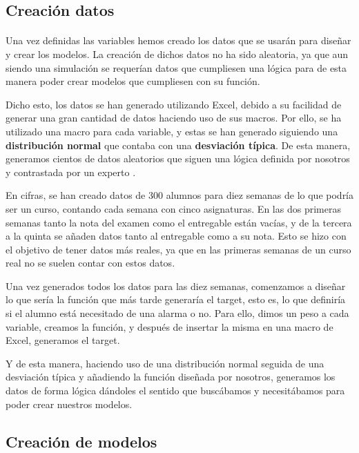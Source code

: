 \subsection{Creación datos}
\paragraph{}
Una vez definidas las variables hemos creado los datos que se usarán para diseñar y crear los modelos. La creación de dichos datos no ha sido aleatoria, ya que aun siendo una simulación se requerían datos que cumpliesen una lógica para de esta manera poder crear modelos que cumpliesen con su función.

Dicho esto, los datos se han generado utilizando Excel, debido a su facilidad de generar una gran cantidad de datos haciendo uso de sus macros. Por ello, se ha utilizado una macro para cada variable, y estas se han generado siguiendo una \textbf{distribución normal} que contaba con una \textbf{desviación típica}. De esta manera, generamos cientos de datos aleatorios que siguen una lógica definida por nosotros y contrastada por un experto .

En cifras, se han creado datos de 300 alumnos para diez semanas de lo que podría ser un curso, contando cada semana con cinco asignaturas. En las dos primeras semanas tanto la nota del examen como el entregable están vacías, y de la tercera a la quinta se añaden datos tanto al entregable como a su nota. Esto se hizo con el objetivo de tener datos más reales, ya que en las primeras semanas de un curso real no se suelen contar con estos datos.

Una vez generados todos los datos para las diez semanas, comenzamos a diseñar lo que sería la función que más tarde generaría el target, esto es, lo que definiría si el alumno está necesitado de una alarma o no. Para ello, dimos un peso a cada variable, creamos la función, y después de insertar la misma en una macro de Excel, generamos el target.

Y de esta manera, haciendo uso de una distribución normal seguida de una desviación típica y añadiendo la función diseñada por nosotros, generamos los datos de forma lógica dándoles el sentido que buscábamos y necesitábamos para poder crear nuestros modelos.



\subsection{Creación de modelos}
